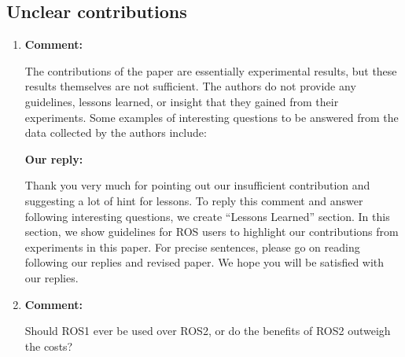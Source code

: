 \documentclass{article}
\begin{document}
\begin{enumerate}
\end{enumerate}

\subsection{Unclear contributions}
\begin{enumerate}

\item \begin{flushleft}
    \textbf{Comment:}
  \end{flushleft}
  The contributions of the paper are essentially experimental results, but these results themselves are not sufficient. The authors do not provide any guidelines, lessons learned, or insight that they gained from their experiments.  Some examples of interesting questions to be answered from the data collected by the authors include:

  \begin{flushleft}
    \textbf{Our reply:}
  \end{flushleft}
  Thank you very much for pointing out our insufficient contribution and suggesting a lot of hint for lessons.
  To reply this comment and answer following interesting questions, we create ``Lessons Learned'' section.
  In this section, we show guidelines for ROS users to highlight our contributions from experiments in this paper.
  For precise sentences, please go on reading following our replies and revised paper.
  We hope you will be satisfied with our replies.

\item \begin{flushleft}
    \textbf{Comment:}
  \end{flushleft}
  Should ROS1 ever be used over ROS2, or do the benefits of ROS2 outweigh the costs?


\end{enumerate}
\end{document}
